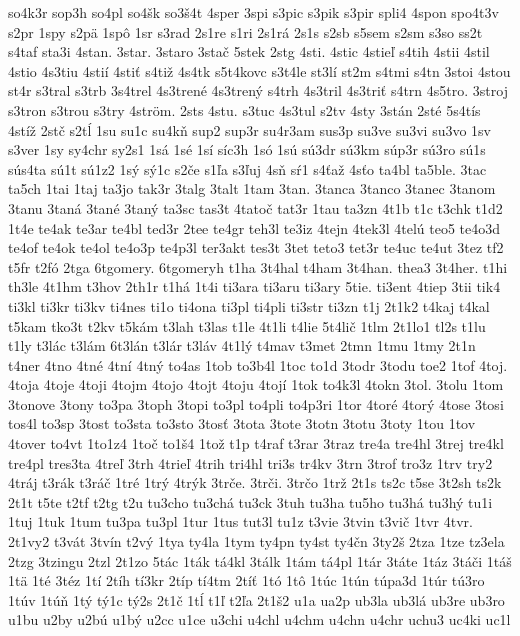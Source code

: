 {so4k3r
sop3h
so4pl
so4šk
so3š4t
4sper
3spi
s3pic
s3pik
s3pir
spli4
4spon
spo4t3v
s2pr
1spy
s2pä
1spô
1sr
s3rad
2s1re
s1ri
2s1rá
2s1s
s2sb
s5sem
s2sm
s3so
ss2t
s4taf
sta3i
4stan.
3star.
3staro
3stač
5stek
2stg
4sti.
4stic
4stieľ
s4tih
4stii
4stil
4stio
4s3tiu
4stií
4stiť
s4tiž
4s4tk
s5t4kovc
s3t4le
st3lí
st2m
s4tmi
s4tn
3stoi
4stou
st4r
s3tral
s3trb
3s4trel
4s3trené
4s3trený
s4trh
4s3tril
4s3triť
s4trn
4s5tro.
3stroj
s3tron
s3trou
s3try
4ström.
2sts
4stu.
s3tuc
4s3tul
s2tv
4sty
3stán
2sté
5s4tís
4stíž
2stč
s2tĺ
1su
su1c
su4kň
sup2
sup3r
su4r3am
sus3p
su3ve
su3vi
su3vo
1sv
s3ver
1sy
sy4chr
sy2s1
1sá
1sé
1sí
síc3h
1só
1sú
sú3dr
sú3km
súp3r
sú3ro
sú1s
sús4ta
sú1t
sú1z2
1sý
sý1c
s2če
s1ľa
s3ľuj
4sň
sŕ1
s4ťaž
4sťo
ta4bl
ta5ble.
3tac
ta5ch
1tai
1taj
ta3jo
tak3r
3talg
3talt
1tam
3tan.
3tanca
3tanco
3tanec
3tanom
3tanu
3taná
3tané
3taný
ta3sc
tas3t
4tatoč
tat3r
1tau
ta3zn
4t1b
t1c
t3chk
t1d2
1t4e
te4ak
te3ar
te4bl
ted3r
2tee
te4gr
teh3l
te3iz
4tejn
4tek3l
4telú
teo5
te4o3d
te4of
te4ok
te4ol
te4o3p
te4p3l
ter3akt
tes3t
3tet
teto3
tet3r
te4uc
te4ut
3tez
tf2
t5fr
t2fó
2tga
6tgomery.
6tgomeryh
t1ha
3t4hal
t4ham
3t4han.
thea3
3t4her.
t1hi
th3le
4t1hm
t3hov
2th1r
t1há
1t4i
ti3ara
ti3aru
ti3ary
5tie.
ti3ent
4tiep
3tii
tik4
ti3kl
ti3kr
ti3kv
ti4nes
ti1o
ti4ona
ti3pl
ti4pli
ti3str
ti3zn
t1j
2t1k2
t4kaj
t4kal
t5kam
tko3t
t2kv
t5kám
t3lah
t3las
t1le
4t1li
t4lie
5t4lič
1tlm
2t1lo1
tl2s
t1lu
t1ly
t3lác
t3lám
6t3lán
t3lár
t3láv
4t1lý
t4mav
t3met
2tmn
1tmu
1tmy
2t1n
t4ner
4tno
4tné
4tní
4tný
to4as
1tob
to3b4l
1toc
to1d
3todr
3todu
toe2
1tof
4toj.
4toja
4toje
4toji
4tojm
4tojo
4tojt
4toju
4tojí
1tok
to4k3l
4tokn
3tol.
3tolu
1tom
3tonove
3tony
to3pa
3toph
3topi
to3pl
to4pli
to4p3ri
1tor
4toré
4torý
4tose
3tosi
tos4l
to3sp
3tost
to3sta
to3sto
3tosť
3tota
3tote
3totn
3totu
3toty
1tou
1tov
4tover
to4vt
1to1z4
1toč
to1š4
1tož
t1p
t4raf
t3rar
3traz
tre4a
tre4hl
3trej
tre4kl
tre4pl
tres3ta
4treľ
3trh
4trieľ
4trih
tri4hl
tri3s
tr4kv
3trn
3trof
tro3z
1trv
try2
4tráj
t3rák
t3ráč
1tré
1trý
4trýk
3trče.
3trči.
3trčo
1trž
2t1s
ts2c
t5se
3t2sh
ts2k
2t1t
t5te
t2tf
t2tg
t2u
tu3cho
tu3chá
tu3ck
3tuh
tu3ha
tu5ho
tu3há
tu3hý
tu1i
1tuj
1tuk
1tum
tu3pa
tu3pl
1tur
1tus
tut3l
tu1z
t3vie
3tvin
t3vič
1tvr
4tvr.
2t1vy2
t3vát
3tvín
t2vý
1tya
ty4la
1tym
ty4pn
ty4st
ty4čn
3ty2š
2tza
1tze
tz3ela
2tzg
3tzingu
2tzl
2t1zo
5tác
1ták
tá4kl
3tálk
1tám
tá4pl
1tár
3táte
1táz
3táči
1táš
1tä
1té
3téz
1tí
2tíh
tí3kr
2típ
tí4tm
2tíť
1tó
1tô
1túc
1tún
túpa3d
1túr
tú3ro
1túv
1túň
1tý
tý1c
tý2s
2t1č
1tĺ
t1ľ
t2ľa
2t1š2
u1a
ua2p
ub3la
ub3lá
ub3re
ub3ro
u1bu
u2by
u2bú
u1bý
u2cc
u1ce
u3chi
u4chl
u4chm
u4chn
u4chr
uchu3
uc4ki
uc1l
}
